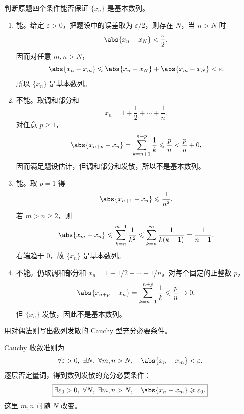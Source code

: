 \begin{xexercise}[3.4.5 练习题 1]
判断原题四个条件能否保证 $\{x_n\}$ 是基本数列。
\end{xexercise}
\begin{xsolution}
\begin{enumerate}[label=(\arabic*)]
  \item 能。给定 $\varepsilon>0$，把题设中的误差取为 $\varepsilon/2$，则存在 $N$，当 $n>N$ 时
  \[
    \abs{x_n-x_N}<\frac\varepsilon2.
  \]
  因而对任意 $m,n>N$，
  \[
    \abs{x_n-x_m}
    \leqslant\abs{x_n-x_N}+\abs{x_m-x_N}<\varepsilon.
  \]
  所以 $\{x_n\}$ 是基本数列。

  \item 不能。取调和部分和
  \[
    x_n=1+\frac12+\cdots+\frac1n.
  \]
  对任意 $p\geqslant1$，
  \[
    \abs{x_{n+p}-x_n}
    =\sum_{k=n+1}^{n+p}\frac1k
    \leqslant\frac{p}{n}<\frac{p}{n}+0,
  \]
  因而满足题设估计，但调和部分和发散，所以不是基本数列。

  \item 能。取 $p=1$ 得
  \[
    \abs{x_{n+1}-x_n}\leqslant\frac1{n^2}.
  \]
  若 $m>n\geqslant2$，则
  \[
    \abs{x_m-x_n}
    \leqslant\sum_{k=n}^{m-1}\frac1{k^2}
    \leqslant\sum_{k=n}^{\infty}\frac1{k(k-1)}
    =\frac1{n-1}.
  \]
  右端趋于 $0$，故 $\{x_n\}$ 是基本数列。

  \item 不能。仍取调和部分和 $x_n=1+1/2+\cdots+1/n$。对每个固定的正整数 $p$，
  \[
    \abs{x_{n+p}-x_n}
    =\sum_{k=n+1}^{n+p}\frac1k
    \leqslant\frac pn\to0,
  \]
  但 $\{x_n\}$ 发散，因此不是基本数列。
\end{enumerate}
\end{xsolution}

\begin{xexercise}[3.4.5 练习题 2]
用对偶法则写出数列发散的 Cauchy 型充分必要条件。
\end{xexercise}
\begin{xsolution}
Cauchy 收敛准则为
\[
  \forall\varepsilon>0,\ \exists N,\ \forall m,n>N,
  \quad \abs{x_n-x_m}<\varepsilon.
\]
逐层否定量词，得到数列发散的充分必要条件：
\[
  \boxed{
  \exists\varepsilon_0>0,\ \forall N,\ \exists m,n>N,
  \quad \abs{x_n-x_m}\geqslant\varepsilon_0.}
\]
这里 $m,n$ 可随 $N$ 改变。
\end{xsolution}

